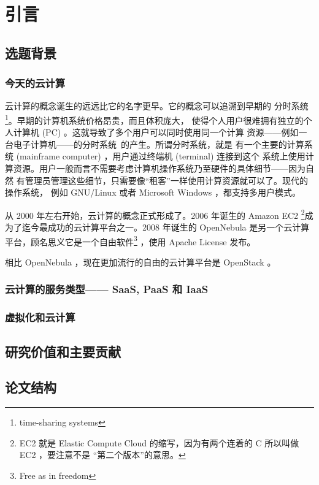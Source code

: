 \chapter{引言}
\label{cha:intro}

\section{选题背景}

\subsection{今天的云计算}

云计算的概念诞生的远远比它的名字更早。它的概念可以追溯到早期的
分时系统\footnote{time-sharing systems}。早期的计算机系统价格昂贵，而且体积庞大，
使得个人用户很难拥有独立的个人计算机 (PC) 。这就导致了多个用户可以同时使用同一个计算
资源——例如一台电子计算机——的分时系统~\cite{timesharing}的产生。所谓分时系统，就是
有一个主要的计算系统 (mainframe computer) ，用户通过终端机 (terminal) 连接到这个
系统上使用计算资源。用户一般而言不需要考虑计算机操作系统乃至硬件的具体细节——因为自然
有管理员管理这些细节，只需要像“租客”一样使用计算资源就可以了。现代的操作系统，
例如 GNU/Linux 或者 Microsoft Windows ，都支持多用户模式。

从 2000 年左右开始，云计算的概念正式形成了。2006 年诞生的 Amazon EC2 \footnote{EC2
  就是 Elastic Compute Cloud 的缩写，因为有两个连着的 C 所以叫做 EC2 ，要注意不是
  “第二个版本”的意思。}成为了迄今最成功的云计算平台之一。2008 年诞生的 OpenNebula
是另一个云计算平台，顾名思义它是一个自由软件\footnote{Free as in freedom}
，使用 Apache License 发布。

相比 OpenNebula ，现在更加流行的自由的云计算平台是 OpenStack 。

\subsection{云计算的服务类型—— SaaS, PaaS 和 IaaS}

\subsection{虚拟化和云计算}

\section{研究价值和主要贡献}

\section{论文结构}
